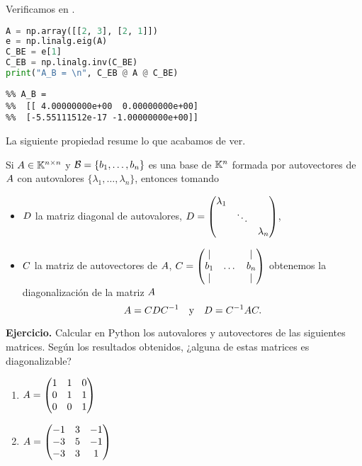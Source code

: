 Verificamos en \python.

\begin{Shaded}
\begin{lstlisting}[language=python]
A = np.array([[2, 3], [2, 1]])
e = np.linalg.eig(A)
C_BE = e[1]
C_EB = np.linalg.inv(C_BE)
print("A_B = \n", C_EB @ A @ C_BE)
\end{lstlisting}
\end{Shaded}

\begin{verbatim}
%% A_B =
%%  [[ 4.00000000e+00  0.00000000e+00]
%%  [-5.55111512e-17 -1.00000000e+00]]
\end{verbatim}

La siguiente propiedad resume lo que acabamos de ver.

\begin{prop}
Si $\Ab \in \K^{n \times n}$ y $\B = \{\bb_1, \dots, \bb_n\}$
es una base de $\mathbb K^n$ formada por autovectores de $\Ab$ con autovalores
$\{\lambda_1, \dots, \lambda_n\}$, entonces tomando

\begin{itemize}
\item   $\Db$ la matriz diagonal de autovalores,
    $\Db = \begin{pmatrix} \lambda_1 & & \\ & \ddots & \\ & & \lambda_n \end{pmatrix}$,
\item   $\Cb$ la matriz de autovectores de $\Ab$,
    $\Cb = \begin{pmatrix} \vert & & \vert \\ \bb_1 & \dots & \bb_n \\ \vert & & \vert \end{pmatrix}$
obtenemos la diagonalización de la matriz $\Ab$
$$
\Ab = \Cb \Db \Cb^{-1} \quad \text{y} \quad \Db = \Cb^{-1} \Ab \Cb.
$$
\end{itemize}
\end{prop}

\textbf{Ejercicio.} Calcular en Python los autovalores y autovectores de las
siguientes matrices. Según los resultados obtenidos, ¿alguna de estas
matrices es diagonalizable?

\begin{enumerate}
\item  $\Ab = \begin{pmatrix} 1 & 1 & 0 \\ 0 & 1 & 1 \\ 0 & 0 & 1 \end{pmatrix}$
\item  $\Ab = \begin{pmatrix} -1 & 3 & -1 \\ -3 & 5 & -1 \\ -3 & 3 & 1 \end{pmatrix}$
\end{enumerate}

